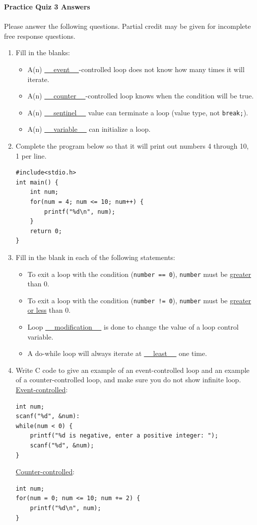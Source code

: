 \documentclass[letter,11pt]{article}
\begin{document}
\huge
\textbf{Practice Quiz 3 Answers}
\normalsize

\paragraph{}Please answer the following questions. Partial credit may be given for incomplete free response questions.

\begin{enumerate}
    \item Fill in the blanks:
    \begin{itemize}
        \item A(n) \underline{~~ event ~~}-controlled loop does not know how many times it will iterate.
        \item A(n) \underline{~~ counter ~~}-controlled loop knows when the condition will be true.
        \item A(n) \underline{~~ sentinel ~~} value can terminate a loop (value type, not \texttt{break;}).
        \item A(n) \underline{~~ variable ~~} can initialize a loop.
    \end{itemize}
    
    \item Complete the program below so that it will print out numbers 4 through 10, 1 per line.
    \begin{verbatim}
#include<stdio.h>
int main() {
    int num;
    for(num = 4; num <= 10; num++) {
        printf("%d\n", num);
    }
    return 0;
}
    \end{verbatim}
    
    \item Fill in the blank in each of the following statements:
    \begin{itemize}
        \item To exit a loop with the condition (\texttt{number == 0}), \texttt{number} must be \underline{greater} than 0.
        \item To exit a loop with the condition (\texttt{number != 0}), \texttt{number} must be \underline{greater or less} than 0.
        \item Loop \underline{~~ modification ~~} is done to change the value of a loop control variable.
        \item A do-while loop will always iterate at \underline{~~ least ~~} one time.
    \end{itemize}
    
    \item Write C code to give an example of an event-controlled loop and an example of a counter-controlled loop, and make sure you do not show infinite loop. \\
    \underline{Event-controlled}:
    \begin{verbatim}
int num;
scanf("%d", &num):
while(num < 0) {
    printf("%d is negative, enter a positive integer: ");
    scanf("%d", &num);
}
    \end{verbatim}
    \underline{Counter-controlled}:
    \begin{verbatim}
int num;
for(num = 0; num <= 10; num += 2) {
    printf("%d\n", num);
}
    \end{verbatim}
    

\end{enumerate}
\end{document}
